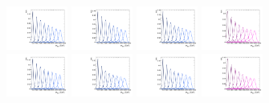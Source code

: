 \begin{figure}[htbp]
  \centering
  \includegraphics[width=0.18\textwidth]{fig/2Dfit/templateSignalVsMX_fromDC_VBFGbuToWW_MVV_mu_HP_bb_LDy.pdf}
  \includegraphics[width=0.18\textwidth]{fig/2Dfit/templateSignalVsMX_fromDC_VBFRadToWW_MVV_mu_HP_bb_LDy.pdf}
  \includegraphics[width=0.18\textwidth]{fig/2Dfit/templateSignalVsMX_fromDC_VBFZprToWW_MVV_mu_HP_bb_LDy.pdf}
  \includegraphics[width=0.18\textwidth]{fig/2Dfit/templateSignalVsMX_fromDC_VBFWprToWZ_MVV_mu_HP_bb_LDy.pdf}\\
  \includegraphics[width=0.18\textwidth]{fig/2Dfit/templateSignalVsMX_fromDC_VBFGbuToWW_MVV_mu_LP_bb_LDy.pdf}
  \includegraphics[width=0.18\textwidth]{fig/2Dfit/templateSignalVsMX_fromDC_VBFRadToWW_MVV_mu_LP_bb_LDy.pdf}
  \includegraphics[width=0.18\textwidth]{fig/2Dfit/templateSignalVsMX_fromDC_VBFZprToWW_MVV_mu_LP_bb_LDy.pdf}
  \includegraphics[width=0.18\textwidth]{fig/2Dfit/templateSignalVsMX_fromDC_VBFWprToWZ_MVV_mu_LP_bb_LDy.pdf}\\

\end{figure}
